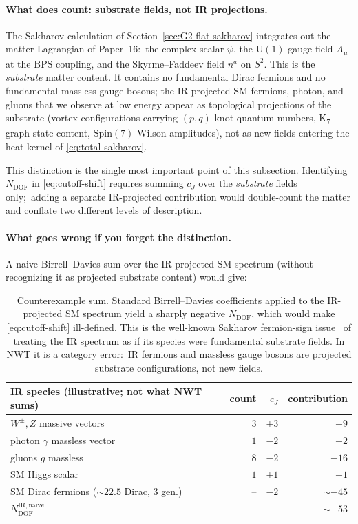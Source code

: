 \documentclass[11pt]{article}
\newcommand{\U}{\mathrm{U}}
\begin{document}
\paragraph{What does count: substrate fields, not IR projections.}
The Sakharov calculation of Section~\ref{sec:G2-flat-sakharov}
integrates out the matter Lagrangian of Paper~16:\ the complex
scalar $\psi$, the $\U(1)$ gauge field $A_\mu$ at the BPS coupling,
and the Skyrme--Faddeev field $n^a$ on $S^2$.  This is the
\emph{substrate} matter content.  It contains no fundamental Dirac
fermions and no fundamental massless gauge bosons; the IR-projected
SM fermions, photon, and gluons that we observe at low energy
appear as topological projections of the substrate (vortex
configurations carrying $(p,q)$-knot quantum numbers, K\textsubscript{7}
graph-state content, $\mathrm{Spin}(7)$ Wilson amplitudes), not as
new fields entering the heat kernel of \eqref{eq:total-sakharov}.

This distinction is the single most important point of this
subsection.  Identifying $N_{\mathrm{DOF}}$ in
\eqref{eq:cutoff-shift} requires summing $c_J$ over the
\emph{substrate} fields only;\ adding a separate IR-projected
contribution would double-count the matter and conflate two
different levels of description.

\paragraph{What goes wrong if you forget the distinction.}
A naive Birrell--Davies sum over the IR-projected SM spectrum
(without recognizing it as projected substrate content) would give:
\begin{table}[H]
\centering
\begin{tabular}{lrrr}
\toprule
\textbf{IR species (illustrative; not what NWT sums)} & \textbf{count} & \textbf{$c_J$} & \textbf{contribution} \\
\midrule
$W^\pm, Z$ massive vectors                       & $3$ & $+3$ & $+9$ \\
photon $\gamma$ massless vector                  & $1$ & $-2$ & $-2$ \\
gluons $g$ massless                              & $8$ & $-2$ & $-16$ \\
SM Higgs scalar                                  & $1$ & $+1$ & $+1$ \\
SM Dirac fermions ($\sim 22.5$ Dirac, 3 gen.)    & --  & $-2$ & $\sim -45$ \\
\midrule
\midrule
$N_{\mathrm{DOF}}^{\mathrm{IR,naive}}$           &     &     & $\sim -53$ \\
\bottomrule
\end{tabular}
\caption{Counterexample sum.  Standard Birrell--Davies
coefficients applied to the IR-projected SM spectrum yield a
sharply negative $N_{\mathrm{DOF}}$, which would make
\eqref{eq:cutoff-shift} ill-defined.  This is the well-known
Sakharov fermion-sign issue~\cite{adler1982, visser2002} of
treating the IR spectrum as if its species were fundamental
substrate fields.  In NWT it is a category error:\ IR fermions and
massless gauge bosons are projected substrate configurations, not
new fields.}
\label{tab:N-IR-counterexample}
\end{table}
\end{document}
